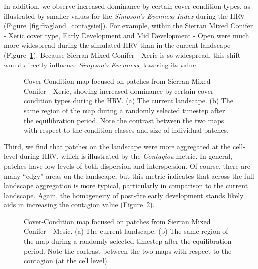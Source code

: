 
In addition, we observe increased dominance by certain cover-condition types, as illustrated by smaller values for the \emph{Simpson's Evenness Index} during the HRV (Figure~\ref{fig:fragland_contagsiei}). For example, within the Sierran Mixed Conifer - Xeric cover type, Early Development and Mid Development - Open were much more widespread during the simulated HRV than in the current landscape (Figure~\ref{fig:patchmaps2}). Because Sierran Mixed Conifer - Xeric is so widespread, this shift would directly influence \emph{Simpson's Evenness}, lowering its value.

\begin{figure}[!htbp]
  \centering
  \caption{Cover-Condition map focused on patches from Sierran Mixed Conifer - Xeric, showing increased dominance by certain cover-condition types during the HRV. (a) The current landscape. (b) The same region of the map during a randomly selected timestep after the equilibration period. Note the contrast between the two maps with respect to the condition classes and size of individual patches.} 
  \label{fig:patchmaps2}
\end{figure}


Third, we find that patches on the landscape were more aggregated at the cell-level during HRV, which is illustrated by the \emph{Contagion} metric. In general, patches have low levels of both dispersion and interspersion. Of course, there are many ``edgy'' areas on the landscape, but this metric indicates that across the full landscape aggregation is more typical, particularly in comparison to the current landscape. Again, the homogeneity of post-fire early development stands likely aids in increasing the contagion value (Figure~\ref{fig:patchmaps3}). 

\begin{figure}[!htbp]
  \centering
  \caption{Cover-Condition map focused on patches from Sierran Mixed Conifer - Mesic. (a) The current landscape. (b) The same region of the map during a randomly selected timestep after the equilibration period. Note the contrast between the two maps with respect to the contagion (at the cell level).} 
  \label{fig:patchmaps3} %
\end{figure}

